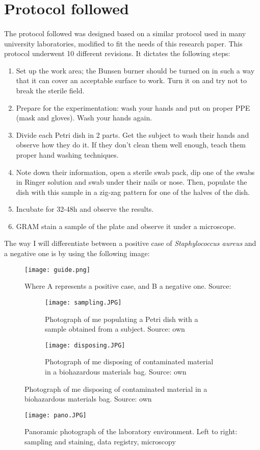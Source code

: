 \section{Protocol followed}
\paragraph{}The protocol followed was designed based on a similar protocol used in many university laboratories\cite{olearyPracticalHandbookMicrobiology1989}, modified to fit the needs of this research paper. This protocol underwent 10 different revisions. It dictates the following steps: \newline
\begin{enumerate}[label=\arabic*)]
\item Set up the work area; the Bunsen burner should be turned on in such a way that it can cover an acceptable surface to work. Turn it on and try not to break the sterile field.
\item Prepare for the experimentation: wash your hands and put on proper PPE (mask and gloves). Wash your hands again.
\item Divide each Petri dish in 2 parts. Get the subject to wash their hands and observe how they do it. If they don't clean them well enough, teach them proper hand washing techniques.
\item Note down their information, open a sterile swab pack, dip one of the swabs in Ringer solution and swab under their nails or nose. Then, populate the dish with this sample in a zig-zag pattern for one of the halves of the dish.
\item Incubate for 32-48h and observe the results.
\item GRAM stain a sample of the plate and observe it under a microscope.
\end{enumerate}
The way I will differentiate between a positive case of \emph{Staphylococcus aureus} and a negative one is by using the following image:
\begin{center}\begin{figure}[H]\centering\texttt{[image: guide.png]}\caption{Where A represents a positive case, and B a negative one. Source:\cite{nakuleshwardutjasujaFigureStaphylococcusAureus}}\end{figure}\end{center}
\begin{figure}[h!] \centering \begin{subfigure}[b]{0.4\linewidth} \texttt{[image: sampling.JPG]} \caption{Photograph of me populating a Petri dish with a sample obtained from a subject. Source: own} \end{subfigure} \begin{subfigure}[b]{0.4\linewidth} \texttt{[image: disposing.JPG]} \caption{Photograph of me disposing of contaminated material in a biohazardous materials bag. Source: own} \end{subfigure}\label{fig:coffee}\end{figure}
\begin{center}\begin{figure}[H]\centering\texttt{[image: pano.JPG]}\caption{Panoramic photograph of the laboratory environment. Left to right: sampling and staining, data registry, microscopy}\end{figure}\end{center}
\newpage